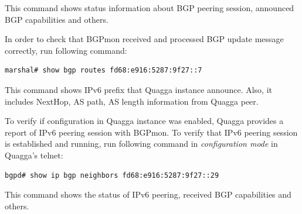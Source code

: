 This command shows status information about BGP peering session, announced BGP capabilities and others.

In order to check that BGPmon received and processed  BGP update message correctly, run following command:
\begin{verbatim}
marshal# show bgp routes fd68:e916:5287:9f27::7
\end{verbatim}

This command shows IPv6 prefix that Quagga instance announce. Also, it includes NextHop, AS path, AS length information from Quagga peer. 

To verify if configuration in Quagga instance was enabled, Quagga provides a report of IPv6 peering session with BGPmon. To verify that IPv6 peering session is established and running,  run following command in \emph{configuration mode} in  Quagga's telnet:

\begin{verbatim}
bgpd# show ip bgp neighbors fd68:e916:5287:9f27::29 
\end{verbatim}

This command shows the status of IPv6 peering, received BGP capabilities and others.  